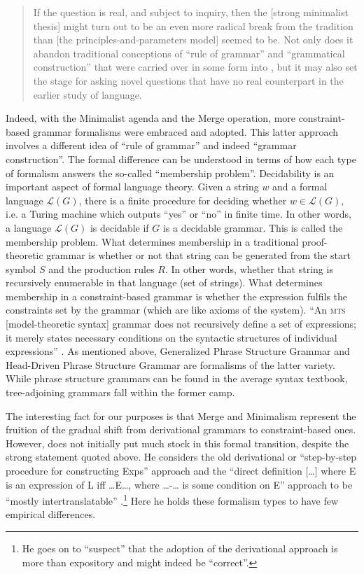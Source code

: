 \documentclass[output=paper]{langscibook}
\begin{document}
\begin{quote}
If the question is real, and subject to inquiry, then the [strong minimalist thesis] might turn out to be an even more radical break from the tradition than [the principles-and-parameters model] seemed to be. Not only does it abandon traditional conceptions of ``rule of grammar'' and ``grammatical construction'' that were carried over in some form into , but it may also set the stage for asking novel questions that have no real counterpart in the earlier study of language. \citep[92]{Chomsky2000}
\end{quote}

Indeed, with the Minimalist agenda and the Merge operation, more constraint-based grammar formalisms were embraced and adopted. This latter approach involves a different idea of ``rule of grammar'' and indeed ``grammar construction''. The formal difference can be understood in terms of how each type of formalism answers the so-called ``membership problem''. Decidability is an important aspect of formal language theory. Given a string $w$ and a formal language $\mathcal{L}(G)$, there is a finite procedure for deciding whether $w\in\mathcal{L}(G),$ i.e. a Turing machine which outputs {}``yes'' or {}``no'' in finite time. In other words, a language $\mathcal{L}(G)$ is decidable if
$G$ is a decidable grammar. This is called the membership problem. What determines membership in a traditional proof-theoretic grammar is whether or not that string can be generated from the start symbol $S$ and the production rules $R$. In other words, whether that string is recursively enumerable in that language (set of strings). What determines membership in a constraint-based grammar is whether the expression fulfils the constraints set by the grammar (which are like axioms of the system). ``An \textsc{mts} [model-theoretic syntax] grammar does not recursively define a set of expressions; it merely states necessary conditions on the syntactic structures of individual expressions'' \citep[19]{Pullum2001}. As mentioned above, Generalized Phrase Structure Grammar and Head-Driven Phrase Structure Grammar are formalisms of the latter variety. While phrase structure grammars can be found in the average syntax textbook, tree-adjoining grammars fall within the former camp.

The interesting fact for our purposes is that Merge and Minimalism represent the fruition of the gradual shift from derivational grammars to constraint-based ones. However, \cite{Chomsky2000} does not initially put much stock in this formal transition, despite the strong statement quoted above. He considers the old derivational or ``step-by-step procedure for constructing Exps'' approach and the ``direct definition […] where E is an expression of L iff …E…, where …-… is some condition on E'' approach to be ``mostly intertranslatable'' \citep[99]{Chomsky2000}.\footnote{He goes on to ``suspect'' that the adoption of the derivational approach is more than expository and might indeed be ``correct''.} Here he holds these formalism types to have few empirical differences.
\end{document}
